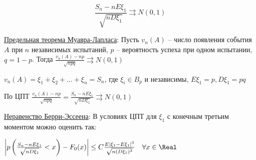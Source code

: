 \begin{enumerate}
    \[\frac{S_n - nE\xi_1}{\sqrt{nD\xi_1}} \rightrightarrows N(0, 1)\]

    \hyperlink{limittheoremdemoivrelaplace}{Предельная теорема Муавра-Лапласа}: Пусть $v_n(A)$ -- число появления события $A$ при $n$ независимых испытаний, $p$ -- вероятность успеха при одном испытании, $q = 1 - p$.
    Тогда $\frac{v_n(A) - np}{\sqrt{npq}} \rightrightarrows N(0, 1)$

    \begin{MyProof}
        $v_n(A) = \xi_1 + \xi_2 + \dots + \xi_n = S_n$, где $\xi_i \in B_p$ и независимы, $E\xi_1 = p, D\xi_1 = pq$

        По ЦПТ $\frac{v_n(A) - np}{\sqrt{npq}} = \frac{S_n - nE\xi_1}{\sqrt{nD\xi_1}} \rightrightarrows N(0, 1)$
    \end{MyProof}

    \hyperlink{berryesseentheorem}{Неравенство Берри-Эссеена}: В условиях ЦПТ для $\xi_1$ с конечным третьим моментом можно оценить так:

    $\left|p\left(\frac{S_n - nE\xi_1}{\sqrt{nD\xi_1}} < x\right) - F_0(x)\right| \leq C\frac{E|\xi_1 - E\xi_1|^3}{\sqrt{n(D\xi_1)^3}} \quad \forall x \in \Real$


\end{enumerate}
